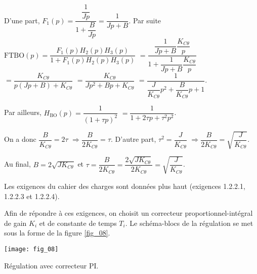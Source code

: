 
\ifprof
\begin{corrige}
D'une part, $F_1(p)=\dfrac{\dfrac{1}{Jp}}{1+\dfrac{B}{Jp}} = \dfrac{1}{Jp+B}$.
Par suite $\text{FTBO}(p) = \dfrac{F_1(p) H_2(p) H_3(p)}{1+F_1(p) H_2(p) H_3(p)}$
$= \dfrac{\dfrac{1}{Jp+B} \dfrac{K_{C\theta}}{p}}{1+\dfrac{1}{Jp+B} \dfrac{K_{C\theta}}{p}}$
$= \dfrac{K_{C\theta}}{p\left(Jp+B\right)+K_{C\theta}}$
$= \dfrac{K_{C\theta}}{Jp^2+Bp+K_{C\theta}}$
$= \dfrac{1}{\dfrac{J}{K_{C\theta}}p^2+\dfrac{B}{K_{C\theta}}p+1}$.

Par ailleurs, 
$H_{\text{BO}}(p)=\dfrac{1}{\left(1+\tau p\right)^2}$
$=\dfrac{1}{1+2\tau p + \tau^2 p^2}$.

On a donc $\dfrac{B}{K_{C\theta}} = 2\tau$ $\Rightarrow \dfrac{B}{2K_{C\theta}} =\tau$.
D'autre part, $ \tau^2 =\dfrac{J}{K_{C\theta}}$  $\Rightarrow \dfrac{B}{2K_{C\theta}}=\sqrt{\dfrac{J}{K_{C\theta}}}$. 


Au final, ${B}=2\sqrt{JK_{C\theta}}$ et $\tau = \dfrac{B}{2K_{C\theta}} =\dfrac{2\sqrt{JK_{C\theta}}}{2K_{C\theta}}=\sqrt{\dfrac{J}{K_{C\theta}}}$.

\end{corrige}
\else
\fi



Les exigences du cahier des charges sont données plus haut (exigences 1.2.2.1, 1.2.2.3 et 1.2.2.4).

Afin de répondre à ces exigences, on choisit un correcteur proportionnel-intégral de gain $K_i$ et de constante de temps $T_i$. Le schéma-blocs de la régulation se met sous la forme de la figure \ref{fig_08}.

\begin{marginfigure}
\centering
\texttt{[image: fig\_08]}
\caption{Régulation avec correcteur PI. \label{fig_08}}
\end{marginfigure}




